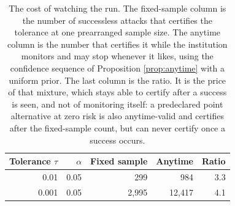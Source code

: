 \begin{table}[t]
\centering
\caption{The cost of watching the run. The fixed-sample column is the number of successless attacks that certifies the tolerance at one prearranged sample size. The anytime column is the number that certifies it while the institution monitors and may stop whenever it likes, using the confidence sequence of Proposition \ref{prop:anytime} with a uniform prior. The last column is the ratio. It is the price of that mixture, which stays able to certify after a success is seen, and not of monitoring itself: a predeclared point alternative at zero risk is also anytime-valid and certifies after the fixed-sample count, but can never certify once a success occurs.}
\label{tab:anytime}
\begin{tabular}{rrrrr}
\toprule
Tolerance $\tau$ & $\alpha$ & Fixed sample & Anytime & Ratio \\
\midrule
0.01 & 0.05 & 299 & 984 & 3.3 \\
0.001 & 0.05 & 2{,}995 & 12{,}417 & 4.1 \\
\bottomrule
\end{tabular}
\end{table}
